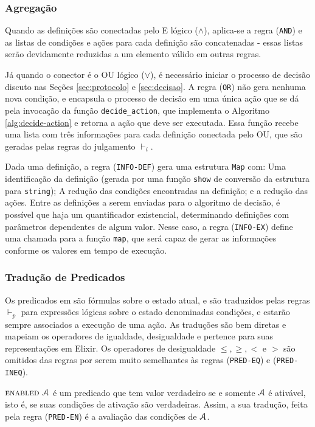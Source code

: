 \subsubsection{Agregação}


Quando as definições são conectadas pelo E lógico ($\land$), aplica-se a regra
(\texttt{AND}) e as listas de
condições e ações para cada definição são concatenadas - essas listas serão
devidamente reduzidas a um elemento válido em outras regras.

Já quando o conector é o OU lógico ($\lor$), é necessário iniciar o processo de decisão
discuto nas Seções \ref{sec:protocolo} e \ref{sec:decisao}. A regra
(\texttt{OR}) não gera nenhuma nova condição, e encapsula o processo de decisão
em uma única ação que se dá pela invocação da função \texttt{decide\_action},
que implementa o Algoritmo \ref{alg:decide-action} e retorna a ação que deve ser
executada. Essa função recebe uma lista com três informações para cada definição conectada
pelo OU, que são geradas pelas regras do julgamento $\vdash_i$.

Dada uma definição, a regra (\texttt{INFO-DEF}) gera uma estrutura \texttt{Map}
com: Uma identificação da definição (gerada por uma função \texttt{show} de
conversão da estrutura para \texttt{string}); A redução das condições
encontradas na definição; e a redução das ações. Entre as definições a serem
enviadas para o algoritmo de decisão, é possível que haja um quantificador
existencial, determinando definições com parâmetros dependentes
de algum valor. Nesse caso, a regra (\texttt{INFO-EX}) define uma chamada para a
função \texttt{map}, que será capaz de gerar as informações conforme os valores
em tempo de execução.


\subsubsection{Tradução de Predicados}

Os predicados em \TLA são fórmulas sobre o estado atual, e são traduzidos pelas
regras $\vdash_p$ para expressões lógicas sobre o estado denominadas condições, e estarão sempre
associados a execução de uma ação. As traduções são bem diretas e mapeiam os
operadores de igualdade, desigualdade e pertence para suas representações em
Elixir. Os operadores de desigualdade $\leq, \geq, <$ e $>$ são omitidos das
regras por serem muito semelhantes às regras (\texttt{PRED-EQ}) e
(\texttt{PRED-INEQ}).

$\textsc{enabled } \textbf{$\mathcal{A}$}$ é um predicado que tem valor verdadeiro se e somente
$\textbf{$\mathcal{A}$}$ é ativável, isto é, se suas condições de ativação são verdadeiras.
Assim, a sua tradução, feita pela regra (\texttt{PRED-EN}) é a avaliação das condições de $\textbf{$\mathcal{A}$}$.

